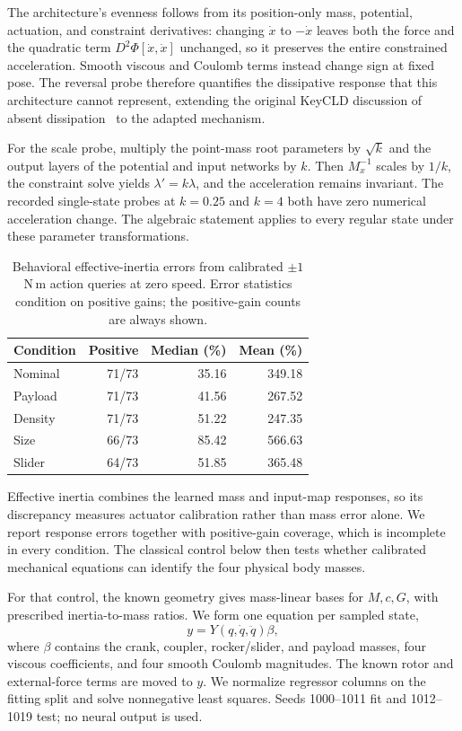 The architecture's evenness follows from its position-only mass, potential, actuation, and constraint derivatives: changing $\dot x$ to $-\dot x$ leaves both the force and the quadratic term $D^2\Phi[\dot x,\dot x]$ unchanged, so it preserves the entire constrained acceleration. Smooth viscous and Coulomb terms instead change sign at fixed pose. The reversal probe therefore quantifies the dissipative response that this architecture cannot represent, extending the original KeyCLD discussion of absent dissipation~\cite{daems2024keycld} to the adapted mechanism.

For the scale probe, multiply the point-mass root parameters by $\sqrt{k}$ and the output layers of the potential and input networks by $k$. Then $M_x^{-1}$ scales by $1/k$, the constraint solve yields $\lambda' = k\lambda$, and the acceleration remains invariant. The recorded single-state probes at $k=0.25$ and $k=4$ both have zero numerical acceleration change. The algebraic statement applies to every regular state under these parameter transformations.

\begin{table}[t]
\caption{Behavioral effective-inertia errors from calibrated $\pm1$ N\,m action queries at zero speed. Error statistics condition on positive gains; the positive-gain counts are always shown.}
\centering
\small
\begin{tabular}{lrrr}
\toprule
Condition & Positive & Median (\%) & Mean (\%)\\
\midrule
Nominal & 71/73 & 35.16 & 349.18 \\
Payload & 71/73 & 41.56 & 267.52 \\
Density & 71/73 & 51.22 & 247.35 \\
Size & 66/73 & 85.42 & 566.63 \\
Slider & 64/73 & 51.85 & 365.48 \\
\bottomrule
\end{tabular}
\end{table}

Effective inertia combines the learned mass and input-map responses, so its discrepancy measures actuator calibration rather than mass error alone. We report response errors together with positive-gain coverage, which is incomplete in every condition. The classical control below then tests whether calibrated mechanical equations can identify the four physical body masses.

For that control, the known geometry gives mass-linear bases for $M,c,G$, with prescribed inertia-to-mass ratios. We form one equation per sampled state,
\begin{equation}
y=Y(q,\dot q,\ddot q)\beta,
\end{equation}
where $\beta$ contains the crank, coupler, rocker/slider, and payload masses, four viscous coefficients, and four smooth Coulomb magnitudes. The known rotor and external-force terms are moved to $y$. We normalize regressor columns on the fitting split and solve nonnegative least squares. Seeds 1000--1011 fit and 1012--1019 test; no neural output is used.

